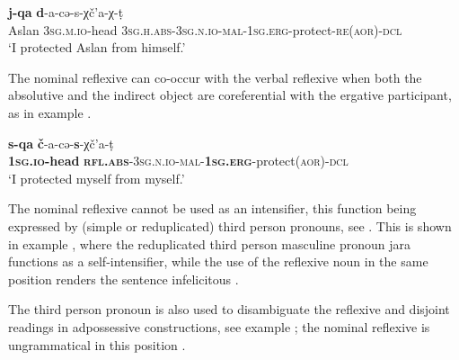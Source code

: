 \documentclass[output=paper]{langscibook}
\begin{document}
\ea 
    \label{ex:Arkadiev:35}
      \textbf{{j-qa}} \textbf{{d}}{{}-a-c{ə}-s-χč’a-χ-t{̣}}\\
   Aslan  \textsc{3sg.m.io}{}-head  \textsc{3sg.h.abs-3sg.n.io-mal-1sg.erg}{}-protect-\textsc{re(aor)-dcl}\\
    \glt ‘I protected Aslan from himself.’
\z


The nominal reflexive can co-occur with the verbal reflexive when both the absolutive and the indirect object are coreferential with the ergative participant, as in example .


\ea 
    \label{ex:Arkadiev:36}
    \gll \textbf{{s-qa}}  \textbf{{č}}{{}-a-c{ə}-}\textbf{{s}}{{}-χč’a-t{̣}}\\
   \textbf{\textsc{1sg.io}}\textbf{{}-head}  \textbf{\textsc{rfl.abs}}\textsc{{}-3sg.n.io-mal-}\textbf{\textsc{1sg.erg}}{}-protect(\textsc{aor)-dcl}\\
    \glt ‘I protected myself from myself.’
\z


The nominal reflexive cannot be used as an intensifier, this function being expressed by (simple or reduplicated) third person pronouns, see \citet{Panova2020}. This is shown in example , where the reduplicated third person masculine pronoun {jara} functions as a {self}{}-intensifier, while the use of the reflexive noun in the same position renders the sentence infelicitous .


\ea 
\label{ex:Arkadiev:37}
    
    \z
\z

The third person pronoun is also used to disambiguate the reflexive and disjoint readings in adpossessive constructions, see example ; the nominal reflexive is ungrammatical in this position .
\ea 
\label{ex:Arkadiev:38}
    
\end{document}
